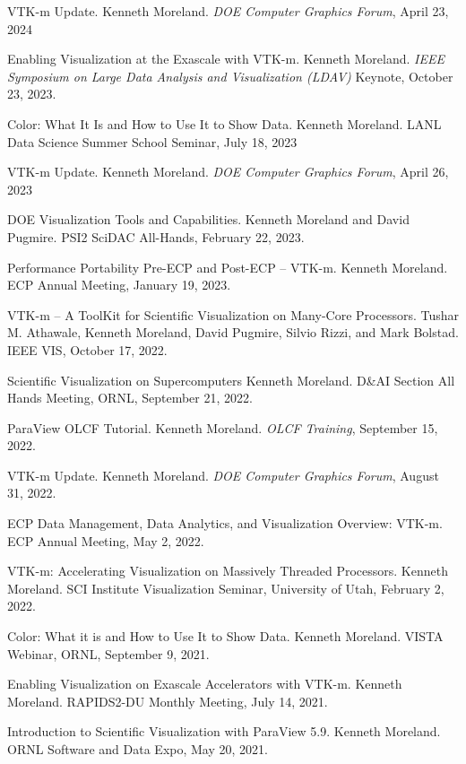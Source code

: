 \documentclass{article}
\begin{document}
\begin{enumerate}[label={[\arabic*]}]
\item VTK-m Update.
  Kenneth Moreland.
  \emph{DOE Computer Graphics Forum}, April 23, 2024
\item Enabling Visualization at the Exascale with VTK-m.
  Kenneth Moreland.
  \emph{IEEE Symposium on Large Data Analysis and Visualization (LDAV)} Keynote,
  October 23, 2023.
\item Color: What It Is and How to Use It to Show Data.
  Kenneth Moreland.
  LANL Data Science Summer School Seminar, July 18, 2023
\item VTK-m Update.
  Kenneth Moreland.
  \emph{DOE Computer Graphics Forum}, April 26, 2023
\item DOE Visualization Tools and Capabilities.
  Kenneth Moreland and David Pugmire.
  PSI2 SciDAC All-Hands, February 22, 2023.
\item Performance Portability Pre-ECP and Post-ECP -- VTK-m.
  Kenneth Moreland.
  ECP Annual Meeting, January 19, 2023.
\item VTK-m -- A ToolKit for Scientific Visualization on Many-Core Processors.
  Tushar M. Athawale, Kenneth Moreland, David Pugmire, Silvio Rizzi, and Mark Bolstad.
  IEEE VIS, October 17, 2022.
\item Scientific Visualization on Supercomputers
  Kenneth Moreland.
  D\&AI Section All Hands Meeting, ORNL, September 21, 2022.
\item ParaView OLCF Tutorial.
  Kenneth Moreland.
  \emph{OLCF Training}, September 15, 2022.
\item VTK-m Update.
  Kenneth Moreland.
  \emph{DOE Computer Graphics Forum}, August 31, 2022.
\item ECP Data Management, Data Analytics, and Visualization Overview: VTK-m.
  ECP Annual Meeting, May 2, 2022.
\item VTK-m: Accelerating Visualization on Massively Threaded Processors.
  Kenneth Moreland.
  SCI Institute Visualization Seminar, University of Utah, February 2, 2022.
\item Color: What it is and How to Use It to Show Data.
  Kenneth Moreland.
  VISTA Webinar, ORNL, September 9, 2021.
\item Enabling Visualization on Exascale Accelerators with VTK-m.
  Kenneth Moreland.
  RAPIDS2-DU Monthly Meeting, July 14, 2021.
\item Introduction to Scientific Visualization with ParaView 5.9.
  Kenneth Moreland.
  ORNL Software and Data Expo, May 20, 2021.

\end{enumerate}
\end{document}
